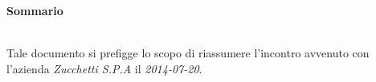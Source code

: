 \noindent\begin{Large}\textbf{Sommario}\end{Large}\\
\noindent Tale documento si prefigge lo scopo di riassumere l'incontro avvenuto con l'azienda \textit{Zucchetti S.P.A} il \textit{2014-07-20}.\\

